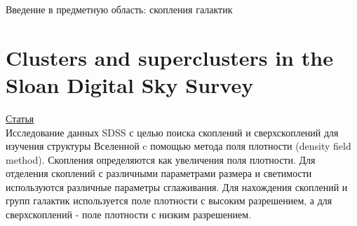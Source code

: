 \documentclass{article}
\begin{document}
\begin{center}{\huge Введение в предметную область: скопления галактик\\}\end{center}

\section{Clusters and superclusters in the Sloan Digital Sky Survey}
\hyperlink{https://www.aanda.org/articles/aa/pdf/2003/26/aah4162.pdf}{Статья}\\

Исследование данных SDSS с целью поиска скоплений и сверхскоплений для изучения структуры Вселенной 
c помощью метода поля плотности (density field method). Скопления определяются как увеличения поля 
плотности. Для отделения скоплений с различными параметрами размера и светимости используются 
различные параметры сглаживания. Для нахождения скоплений и групп галактик используется поле 
плотности с высоким разрешением, а для сверхскоплений - поле плотности с низким разрешением.\\ 
\end{document}
